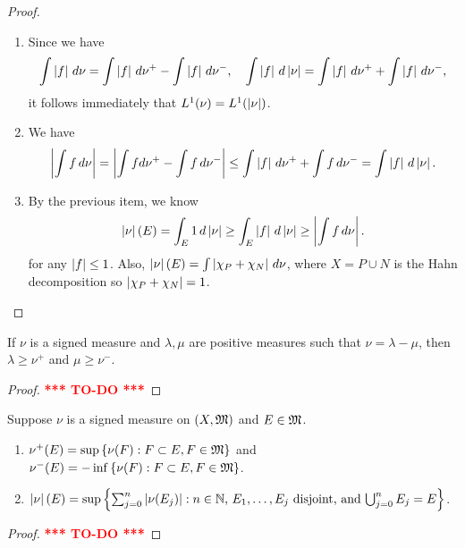 \documentclass[a4paper]{article}
\newcommand{\TODO}{\textcolor{red}{\textbf{*** TO-DO ***}}}
\begin{document}
\begin{proof}
\begin{enumerate}
\item Since we have 
\[
\int \left\lvert f\right\rvert \, d \nu = \int \left\lvert f\right\rvert \, d \nu^+ - \int \left\lvert f\right\rvert \, d \nu^-, 
\quad 
\int \left\lvert f\right\rvert \, d \left\lvert \nu\right\rvert = \int \left\lvert f\right\rvert \, d \nu^+ + \int \left\lvert f\right\rvert 
\, d \nu^-,
\]
it follows immediately that $L^1 (\nu) = L^1 (\left\lvert \nu\right\rvert)$.

\item We have 
\[
\begin{aligned}
\left\lvert \int f \, d \nu\right\rvert = \left\lvert \int f d \nu^+ - \int f \, d \nu^-\right\rvert 
\leq \int \left\lvert f\right\rvert \, d \nu^+ + \int f \, d \nu^- 
= \int \left\lvert f\right\rvert \, d \left\lvert \nu\right\rvert.
\end{aligned}
\]

\item By the previous item, we know
\[
\left\lvert \nu\right\rvert (E) = \int_E 1 \, d \left\lvert \nu\right\rvert \geq \int_E \left\lvert f\right\rvert 
\, d \left\lvert \nu\right\rvert \geq \left\lvert \int f \, d \nu\right\rvert.
\]
for any $\left\lvert f\right\rvert \leq 1$. Also, $\left\lvert \nu\right\rvert(E) = 
\int \left\lvert \chi_P + \chi_N\right\rvert \, d \nu$, where $X = P \cup N$ is the 
Hahn decomposition so $\left\lvert \chi_P + \chi_N\right\rvert = 1$.
\end{enumerate}
\end{proof}

\begin{ex}[Folland 3.4]
If $\nu$ is a signed measure and $\lambda, \mu$ are positive
measures such that $\nu = \lambda - \mu$, then $\lambda \geq \nu^+$
and $\mu \geq \nu^-$.
\end{ex}

\begin{proof}
  \TODO
\end{proof}


\begin{ex}[Folland 3.7]
Suppose $\nu$ is a signed measure on $(X, \mathfrak{M})$ and $E \in \mathfrak{M}$.
\begin{enumerate}
\item $\nu^+ (E) = \sup \left\{ \nu(F) : F \subset E, F \in \mathfrak{M} 
\right\}$ and $\nu^-(E) = - \inf \left\{ \nu(F) : F \subset E, 
F \in \mathfrak{M} \right\}$. 

\item $\left\lvert \nu\right\rvert(E) = \sup \left\{ \sum_{j=0}^n \left\lvert \nu(E_j)\right\rvert 
: \text{$n \in \mathbb{N}$, $E_1, \dots, E_j$ disjoint, and 
$\bigcup_{j=0}^n E_j = E$} \right\}$.
\end{enumerate}
\end{ex}

\begin{proof}
\TODO
\end{proof}
\end{document}
